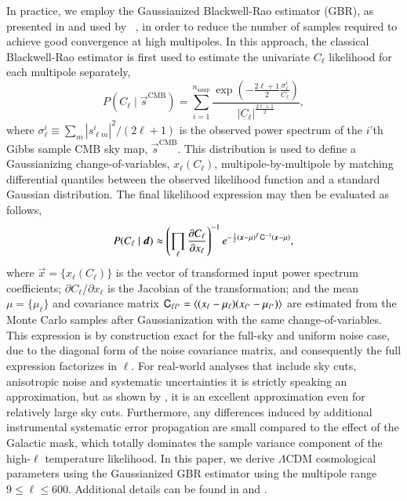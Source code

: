 \documentclass[onecolumn]{aa}
\renewcommand{\d}[0]{\vec{d}}
\newcommand{\x}[0]{\vec{x}}
\newcommand{\s}[0]{\vec{s}}
\newcommand{\Cp}[0]{\tens{C}}
\begin{document}
In practice, we employ the Gaussianized Blackwell-Rao estimator (GBR),
as presented in \citet{rudjord:2009} and used by
\Planck\ \citep{planck2016-l05}, in order to reduce the number of
samples required to achieve good convergence at high
multipoles. In this approach, the classical Blackwell-Rao estimator is
first used to estimate the univariate $C_{\ell}$ likelihood for each
multipole separately,
\begin{equation}
  P(C_{\ell}\mid\s^{\mathrm{CMB}}) =
  \sum_{i = 1}^{n_{\mathrm{samp}}} \frac{\exp({-\frac{2\ell+1}{2}\frac{\sigma^i_{\ell}}{C_{\ell}}})}{|C_{\ell}|^{\frac{2\ell+1}{2}}},
\end{equation}
where $\sigma^i_{\ell} \equiv \sum_{m} |s^i_{\ell m}|^2/(2\ell+1)$ is
the observed power spectrum of the $i$'th Gibbs sample CMB sky map,
$\s^{\mathrm{CMB}}$. This distribution is used to define a
Gaussianizing change-of-variables, $x_{\ell}(C_{\ell})$,
multipole-by-multipole by matching differential quantiles between the
observed likelihood function and a standard Gaussian distribution. The
final likelihood expression may then be evaluated as follows,
\begin{equation}
  \label{eq:GBR}
  P(C_\ell\mid\d)\approx \left(\prod_\ell\frac{\partial C_\ell}{\partial x_\ell}
  \right)^{-1} e^{-\frac{1}{2}(\x-\mu)^T\Cp^{-1}(\x-\mu)},
\end{equation}
where $\x=\lbrace x_\ell(C_{\ell})\rbrace$ is the vector of transformed
input power spectrum coefficients; $\partial C_\ell/\partial x_\ell$
is the Jacobian of the transformation; and the mean
$\mu=\lbrace\mu_\ell\rbrace$ and covariance matrix $\Cp_{\ell\ell'}=
\langle (x_\ell-\mu_\ell)(x_{\ell'}-\mu_{\ell'})\rangle$ are estimated
from the Monte Carlo samples after Gaussianization with the same
change-of-variables. This expression is by construction exact for the
full-sky and uniform noise case, due to the diagonal form of the noise
covariance matrix, and consequently the full expression factorizes in
$\ell$. For real-world analyses that include sky cuts, anisotropic noise
and systematic uncertainties it is strictly speaking an approximation,
but as shown by \citet{rudjord:2009}, it is an excellent approximation
even for relatively large sky cuts. Furthermore, any differences
induced by additional instrumental systematic error propagation are
small compared to the effect of the Galactic mask, which totally
dominates the sample variance component of the high-$\ell$ temperature
likelihood. In this paper, we derive $\Lambda$CDM cosmological
parameters using the Gaussianized GBR estimator using the multipole
range $9\le\ell\le 600$. Additional details can be found in
\citet{bp01} and \citet{bp11}.
\end{document}
